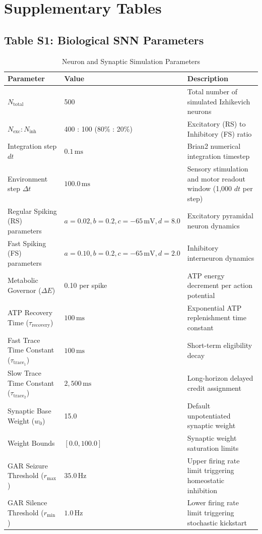\documentclass[utf8]{frontiers_suppmat}
\begin{document}
\section{Supplementary Tables}

\subsection{Table S1: Biological SNN Parameters}

\begin{table}[htbp]
\centering
\small
\renewcommand{\arraystretch}{1.2}
\caption{Neuron and Synaptic Simulation Parameters}
\label{tab:snn_params}
\begin{tabularx}{\linewidth}{l l X}
\toprule
\textbf{Parameter} & \textbf{Value} & \textbf{Description} \\
\midrule
$N_{\text{total}}$ & 500 & Total number of simulated Izhikevich neurons \\
$N_{\text{exc}} : N_{\text{inh}}$ & 400 : 100 (80\% : 20\%) & Excitatory (RS) to Inhibitory (FS) ratio \\
Integration step $dt$ & $0.1\,\text{ms}$ & Brian2 numerical integration timestep \\
Environment step $\Delta t$ & $100.0\,\text{ms}$ & Sensory stimulation and motor readout window (1,000 $dt$ per step) \\
Regular Spiking (RS) parameters & $a=0.02, b=0.2, c=-65\,\text{mV}, d=8.0$ & Excitatory pyramidal neuron dynamics \\
Fast Spiking (FS) parameters & $a=0.10, b=0.2, c=-65\,\text{mV}, d=2.0$ & Inhibitory interneuron dynamics \\
Metabolic Governor ($\Delta E$) & 0.10 per spike & ATP energy decrement per action potential \\
ATP Recovery Time ($\tau_{\text{recovery}}$) & $100\,\text{ms}$ & Exponential ATP replenishment time constant \\
Fast Trace Time Constant ($\tau_{\text{trace}_1}$) & $100\,\text{ms}$ & Short-term eligibility decay \\
Slow Trace Time Constant ($\tau_{\text{trace}_2}$) & $2{,}500\,\text{ms}$ & Long-horizon delayed credit assignment \\
Synaptic Base Weight ($w_0$) & 15.0 & Default unpotentiated synaptic weight \\
Weight Bounds & $[0.0, 100.0]$ & Synaptic weight saturation limits \\
GAR Seizure Threshold ($r_{\text{max}}$) & $35.0\,\text{Hz}$ & Upper firing rate limit triggering homeostatic inhibition \\
GAR Silence Threshold ($r_{\text{min}}$) & $1.0\,\text{Hz}$ & Lower firing rate limit triggering stochastic kickstart \\
\bottomrule
\end{tabularx}
\end{table}
\end{document}
